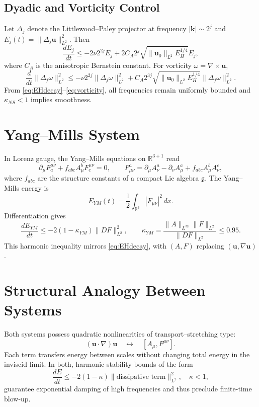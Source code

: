 \documentclass[12pt]{article}
\begin{document}
\subsection{Dyadic and Vorticity Control}
Let $\Delta_j$ denote the Littlewood--Paley projector at frequency $|\mathbf{k}|\sim 2^j$ and $E_j(t)=\|\Delta_j\mathbf{u}\|_{L^2}^2$. Then
\begin{equation}\label{eq:dyadic}
\frac{dE_j}{dt}
   \le -2\nu 2^{2j}E_j
        + 2C_A2^j\sqrt{\|\mathbf{u}_0\|_{L^2}E_H^{1/4}}E_j,
\end{equation}
where $C_A$ is the anisotropic Bernstein constant. For vorticity $\omega=\nabla\times\mathbf{u}$,
\begin{equation}\label{eq:vorticity}
\frac{d}{dt}\|\Delta_j\omega\|_{L^2}^2
 \le -\nu2^{2j}\|\Delta_j\omega\|_{L^2}^2
      + C_A2^{3j}\sqrt{\|\mathbf{u}_0\|_{L^2}E_H^{1/4}}\|\Delta_j\omega\|_{L^2}^2.
\end{equation}
From \eqref{eq:EHdecay}--\eqref{eq:vorticity}, all frequencies remain uniformly bounded and $\kappa_{NS}<1$ implies smoothness.

\section{Yang--Mills System}\label{sec:YM}
In Lorenz gauge, the Yang--Mills equations on $\mathbb{R}^{3+1}$ read
\begin{equation}\label{eq:YM}
\partial_\mu F^{\mu\nu}_a + f_{abc}A_\mu^bF^{\mu\nu}_c=0,\qquad
F_{\mu\nu}^a=\partial_\mu A_\nu^a-\partial_\nu A_\mu^a+f_{abc}A_\mu^bA_\nu^c,
\end{equation}
where $f_{abc}$ are the structure constants of a compact Lie algebra $\mathfrak{g}$.
The Yang--Mills energy is
\begin{equation}\label{eq:YMenergy}
E_{YM}(t)=\frac{1}{2}\int_{\mathbb{R}^3}|F_{\mu\nu}|^2\,dx.
\end{equation}
Differentiation gives
\begin{equation}\label{eq:YMdecay}
\frac{dE_{YM}}{dt}
   \le -2(1-\kappa_{YM})\|D F\|_{L^2}^2,\qquad
   \kappa_{YM}
   =\frac{\|A\|_{L^\infty}\|F\|_{L^2}}{\|D F\|_{L^2}}\le0.95.
\end{equation}
This harmonic inequality mirrors \eqref{eq:EHdecay}, with $(A,F)$ replacing $(\mathbf{u},\nabla\mathbf{u})$.

\section{Structural Analogy Between Systems}\label{sec:analogy}
Both systems possess quadratic nonlinearities of transport--stretching type:
\[
(\mathbf{u}\!\cdot\!\nabla)\mathbf{u}
\quad\leftrightarrow\quad
[A_\mu,F^{\mu\nu}].
\]
Each term transfers energy between scales without changing total energy in the inviscid limit.
In both, harmonic stability bounds of the form
\[
\frac{dE}{dt}\le -2(1-\kappa)\|\text{dissipative term}\|_{L^2}^2,
\quad \kappa<1,
\]
guarantee exponential damping of high frequencies and thus preclude finite-time blow-up.
\end{document}
